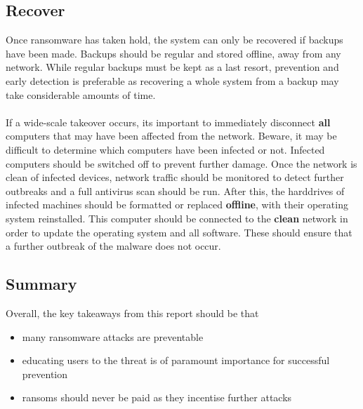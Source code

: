 \documentclass{article}
\begin{document}
\subsection{Recover}
Once ransomware has taken hold, the system can only be recovered if backups have been made. Backups should be regular and stored offline, away from any network.
While regular backups must be kept as a last resort, prevention and early detection is preferable as recovering a whole system from a backup may take considerable amounts of time.
\\\\
If a wide-scale takeover occurs, its important to immediately disconnect \textbf{all} computers that may have been affected from the network. Beware, it may be difficult to determine which computers have been infected or not.
Infected computers should be switched off to prevent further damage.
Once the network is clean of infected devices, network traffic should be monitored to detect further outbreaks and a full antivirus scan should be run.
After this, the harddrives of infected machines should be formatted or replaced \textbf{offline}, with their operating system reinstalled. This computer should be connected to the \textbf{clean} network in order to update the operating system and all software. These should ensure that a further outbreak of the malware does not occur.\cite{ncsc_mitigating_malware}

\subsection{Summary}
Overall, the key takeaways from this report should be that 
\begin{itemize}
	\item many ransomware attacks are preventable
	\item educating users to the threat is of paramount importance for successful prevention
	\item ransoms should never be paid as they incentise further attacks
\end{itemize}
\end{document}

